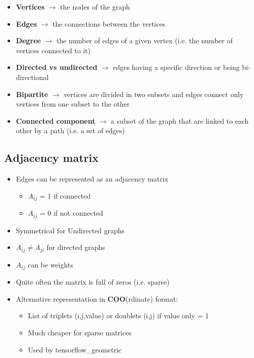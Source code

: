 \begin{tcolorbox}[width=\textwidth,colback={white},title={Some language dictionary },colbacktitle=cyan,coltitle=black]
	\begin{itemize}
		\item \textbf{Vertices} $\rightarrow$ the nodes of the graph
		\item \textbf{Edges} $\rightarrow$ the connections between the vertices
		\item \textbf{Degree} $\rightarrow$ the number of edges of a given vertex (i.e. the number of vertices connected to it)
		\item \textbf{Directed vs undirected} $\rightarrow$ edges having a specific direction or being bi-directional
		\item \textbf{Bipartite} $\rightarrow$ vertices are divided in two subsets and edges connect only
		vertices from one subset to the other
		\item \textbf{Connected component} $\rightarrow$ a subset of the graph that are linked to each other by a path (i.e. a set of edges)
	\end{itemize}
\end{tcolorbox}


\subsection{Adjacency matrix}

\begin{itemize}
	\item Edges can be represented as an adjacency matrix
	\begin{itemize}
		\item $A_{ij}$ = 1 if connected
		\item $A_{ij}$ = 0 if not connected
	\end{itemize}
	\item Symmetrical for Undirected graphs
	\item $A_{ij} \neq A_{ji}$ for directed graphs
	\item $A_{ij}$ can be weights
	\item Quite often the matrix is full of zeros (i.e. sparse)
	\item Alternative representation in \textbf{COO}(rdinate) format:
	\begin{itemize}
		\item List of triplets (i,j,value) or doublets (i,j) if value only = 1
		\item Much cheaper for sparse matrices
		\item Used by tensorflow\_geometric
	\end{itemize}
\end{itemize}

